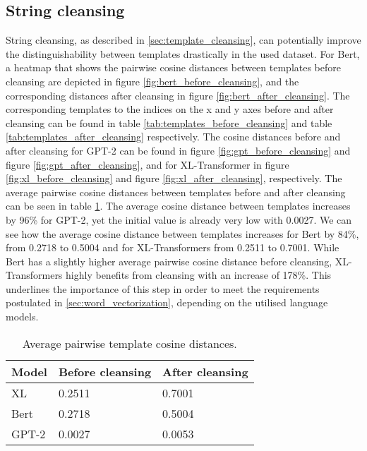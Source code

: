 \subsection{String cleansing}
String cleansing, as described in \ref{sec:template_cleansing}, can potentially improve the distinguishability between templates drastically in the used dataset.
For Bert, a heatmap that shows the pairwise cosine distances between templates before cleansing are depicted in figure \ref{fig:bert_before_cleansing}, and the corresponding distances after cleansing in figure \ref{fig:bert_after_cleansing}. The corresponding templates to the indices on the x and y axes before and after cleansing can be found in table \ref{tab:templates_before_cleansing} and table \ref{tab:templates_after_cleansing} respectively.
The cosine distances before and after cleansing for GPT-2 can be found in figure \ref{fig:gpt_before_cleansing} and figure \ref{fig:gpt_after_cleansing}, and for XL-Transformer in figure \ref{fig:xl_before_cleansing} and figure \ref{fig:xl_after_cleansing}, respectively. The average pairwise cosine distances between templates before and after cleansing can be seen in table \ref{tab:average_pairwise_cos_distances}.
The average cosine distance between templates increases by 96\% for GPT-2, yet the initial value is already very low with 0.0027. We can see how the average cosine distance between templates increases for Bert by 84\%, from 0.2718 to 0.5004 and for XL-Transformers from 0.2511 to 0.7001. While Bert has a slightly higher average pairwise cosine distance before cleansing, XL-Transformers highly benefits from cleansing with an increase of 178\%. This underlines the importance of this step in order to meet the requirements postulated in \ref{sec:word_vectorization}, depending on the utilised language models.



\begin{table}[ht]
\centering
\begin{small}
\begin{tabular}{ p{1.3cm} p{2.5cm} p{2.5cm} }
\toprule
Model & Before cleansing & After cleansing\\
\midrule
XL & 0.2511 & 0.7001\\
Bert & 0.2718 & 0.5004\\
GPT-2 & 0.0027 & 0.0053 \\ 

\bottomrule
\end{tabular}
\caption{Average pairwise template cosine distances.}
\label{tab:average_pairwise_cos_distances}
\end{small}
\end{table}


